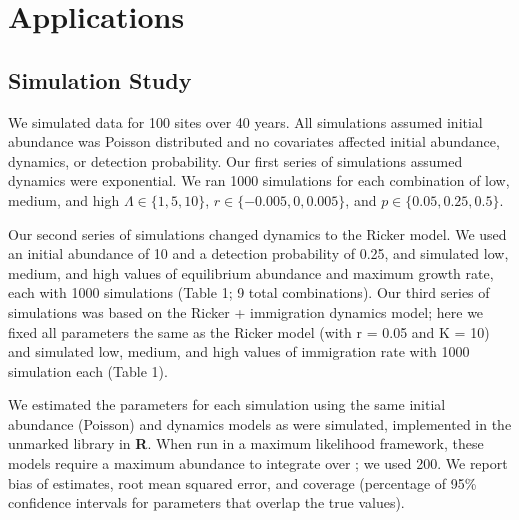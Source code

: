 \documentclass[12pt]{article}
\begin{document}
\section{Applications}
\label{sec:app}

\subsection{Simulation Study}


We simulated data for 100 sites over 40 years.  All
simulations assumed initial abundance was Poisson distributed
and no covariates affected initial abundance, dynamics, or
detection probability.  Our first series of simulations
assumed dynamics were exponential.  We ran 1000 simulations for
each combination of low, medium, and high $\Lambda \in \{1,5,10\}$, $r
\in \{-0.005, 0, 0.005\}$, and
$p \in \{0.05, 0.25, 0.5\}$. %

Our second series of simulations changed dynamics to the Ricker model.
We used an initial abundance of 10 and a detection probability of 0.25,
and simulated low, medium, and high values of equilibrium abundance
and maximum growth rate, each with 1000 simulations (Table 1;
9 total combinations).  Our third series of simulations was based on the
Ricker + immigration dynamics model; here we fixed all parameters the
same as the Ricker model (with r = 0.05 and K = 10) and simulated
low, medium, and high values of immigration rate with 1000 simulation
each (Table 1).

We estimated the parameters for each simulation using the same
initial abundance (Poisson) and dynamics models as were
simulated, implemented in the unmarked library in \textbf{R}.  When run
in a maximum likelihood framework, these models require a
maximum abundance to integrate over
\citep{royle:2004biom,dail_madsen:2011};
we used 200.  We report bias of estimates, root
mean squared error, and coverage (percentage of 95\% confidence
intervals for parameters that
overlap the true values).

\end{document}
